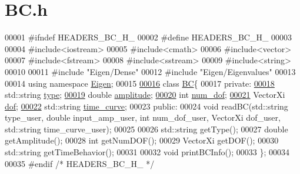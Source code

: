 \hypertarget{_b_c_8h_source}{}\section{B\+C.\+h}
\label{_b_c_8h_source}

\begin{DoxyCode}
00001 \textcolor{preprocessor}{#ifndef HEADERS\_BC\_H\_}
00002 \textcolor{preprocessor}{#define HEADERS\_BC\_H\_}
00003 
00004 \textcolor{preprocessor}{#include<iostream>}
00005 \textcolor{preprocessor}{#include<cmath>}
00006 \textcolor{preprocessor}{#include<vector>}
00007 \textcolor{preprocessor}{#include<fstream>}
00008 \textcolor{preprocessor}{#include<sstream>}
00009 \textcolor{preprocessor}{#include<string>}
00010 
00011 \textcolor{preprocessor}{#include "Eigen/Dense"}
00012 \textcolor{preprocessor}{#include "Eigen/Eigenvalues"}
00013 
00014 \textcolor{keyword}{using namespace }\hyperlink{namespace_eigen}{Eigen};
00015 
\hyperlink{class_b_c}{00016} \textcolor{keyword}{class }\hyperlink{class_b_c}{BC}\{
00017 \textcolor{keyword}{private}:
\hyperlink{class_b_c_ab25297125dceec52f445a3a5efa77784}{00018}     std::string \hyperlink{class_b_c_ab25297125dceec52f445a3a5efa77784}{type};
\hyperlink{class_b_c_a25d7def8fdf5e988602759608b1507ea}{00019}     \textcolor{keywordtype}{double} \hyperlink{class_b_c_a25d7def8fdf5e988602759608b1507ea}{amplitude};
\hyperlink{class_b_c_a71fe2e36793286c4e683a3d8485abaf2}{00020}     \textcolor{keywordtype}{int} \hyperlink{class_b_c_a71fe2e36793286c4e683a3d8485abaf2}{num\_dof};
\hyperlink{class_b_c_a4e53c8862da8b017b419b201911d9e00}{00021}     VectorXi \hyperlink{class_b_c_a4e53c8862da8b017b419b201911d9e00}{dof};
\hyperlink{class_b_c_a84f989feaa5e81214f17b6dbdd1cf2ab}{00022}     std::string \hyperlink{class_b_c_a84f989feaa5e81214f17b6dbdd1cf2ab}{time\_curve};
00023 \textcolor{keyword}{public}:
00024     \textcolor{keywordtype}{void} readBC(std::string type\_user, \textcolor{keywordtype}{double} input\_amp\_user, \textcolor{keywordtype}{int} num\_dof\_user, VectorXi dof\_user, 
      std::string time\_curve\_user);
00025 
00026     std::string getType();
00027     \textcolor{keywordtype}{double} getAmplitude();
00028     \textcolor{keywordtype}{int} getNumDOF();
00029     VectorXi getDOF();
00030     std::string getTimeBehavior();
00031 
00032     \textcolor{keywordtype}{void} printBCInfo();
00033 \};
00034 
00035 \textcolor{preprocessor}{#endif }\textcolor{comment}{/* HEADERS\_BC\_H\_ */}\textcolor{preprocessor}{}
\end{DoxyCode}
